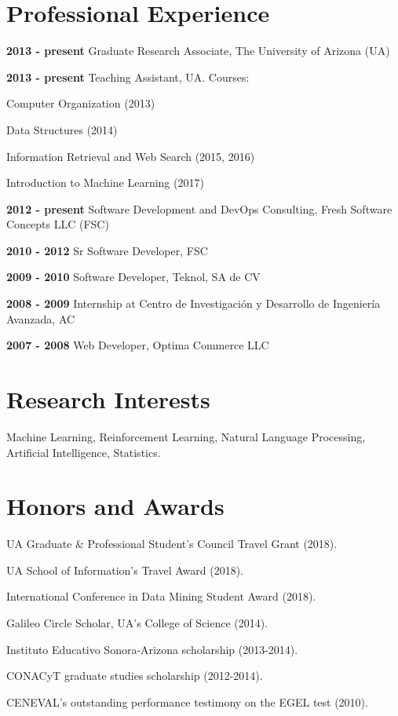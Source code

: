 \documentclass[letterpaper]{article}
\renewenvironment{itemize}{
  \begin{list}{}{
    \setlength{\leftmargin}{1.5em}
  }
}{
  \end{list}
}
\begin{document}
\section*{Professional Experience}

\begin{itemize}
\item \textbf{2013 - present} Graduate Research Associate, The University of Arizona (UA)
\item \textbf{2013 - present} Teaching Assistant, UA. Courses:
\item \begin{itemize}
	\item Computer Organization (2013)
	\item Data Structures (2014)
	\item Information Retrieval and Web Search (2015, 2016)
	\item Introduction to Machine Learning (2017)
\end{itemize}
\item \textbf{2012 - present} Software Development and DevOps Consulting, Fresh Software Concepts LLC (FSC)
\item \textbf{2010 - 2012} Sr Software Developer, FSC
\item \textbf{2009 - 2010} Software Developer, Teknol, SA de CV
\item \textbf{2008 - 2009} Internship at {\small Centro de Investigaci\'{o}n y Desarrollo de Ingenier\'{i}a Avanzada, AC}
\item \textbf{2007 - 2008} Web Developer, Optima Commerce LLC
\end{itemize}

\section*{Research Interests}
Machine Learning, Reinforcement Learning, Natural Language Processing, Artificial Intelligence, Statistics.

\section*{Honors and Awards}
\begin{itemize}
	\item UA Graduate \& Professional Student's Council Travel Grant (2018).
	\item UA School of Information's Travel Award (2018).
	\item International Conference in Data Mining Student Award (2018).
	\item Galileo Circle Scholar, UA's College of Science (2014).
	\item Instituto Educativo Sonora-Arizona scholarship (2013-2014).
	\item CONACyT graduate studies scholarship (2012-2014).
	\item CENEVAL's outstanding performance testimony on the EGEL test (2010). 
\end{itemize}
\end{document}
